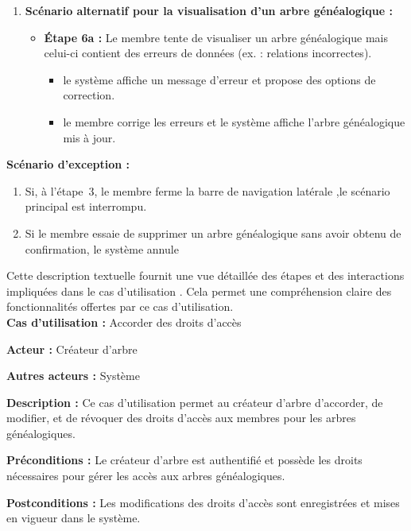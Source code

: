 \begin{enumerate}
    \item \textbf{Scénario alternatif pour la visualisation d'un arbre généalogique :}
    \begin{itemize}
        \item \textbf{Étape 6a :} Le membre tente de visualiser un arbre
          généalogique mais celui-ci contient des erreurs de données (ex. : relations incorrectes).
        \begin{itemize}
            \item le système affiche un message d'erreur et propose des options de correction.
            \item le membre corrige les erreurs et le système affiche l'arbre généalogique mis à jour.
        \end{itemize}
    \end{itemize}

\end{enumerate}

\textbf{Scénario d'exception :}
\begin{enumerate}
  \item Si, à l’étape 3, le membre ferme la barre de navigation latérale
    ,le scénario principal est interrompu.

  \item Si le membre essaie de supprimer un arbre généalogique sans avoir
    obtenu de confirmation, le système annule
\end{enumerate}

Cette description textuelle fournit une vue détaillée des étapes et des
interactions impliquées dans le cas d’utilisation .
Cela permet une compréhension claire des fonctionnalités offertes par ce cas
d’utilisation.
\\

\textbf{Cas d’utilisation :} Accorder des droits d’accès

\textbf{Acteur :} Créateur d'arbre

\textbf{Autres acteurs :} Système

\textbf{Description :} Ce cas d’utilisation permet au créateur d'arbre d'accorder,
de modifier, et de révoquer des droits d'accès aux  membres pour
les arbres généalogiques.

\textbf{Préconditions :} Le créateur d'arbre est authentifié et possède les droits
nécessaires pour gérer les accès aux arbres généalogiques.

\textbf{Postconditions :} Les modifications des droits d'accès sont enregistrées
et mises en vigueur dans le système.

